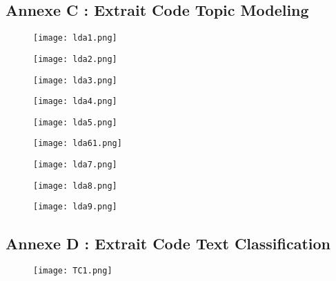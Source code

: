 \documentclass[a4paper,french,12pt]{article}
\begin{document}
\subsection{Annexe C : Extrait Code Topic Modeling}

\begin{figure}[!h]
    \centering
    \texttt{[image: lda1.png]}
\end{figure}

\begin{figure}[!h]
    \centering
    \texttt{[image: lda2.png]}
\end{figure}

\begin{figure}[!h]
    \centering
    \texttt{[image: lda3.png]}
\end{figure}

\begin{figure}[!h]
    \centering
    \texttt{[image: lda4.png]}
\end{figure}

\begin{figure}[!h]
    \centering
    \texttt{[image: lda5.png]}
\end{figure}

\begin{figure}[!h]
    \centering
    \texttt{[image: lda61.png]}
\end{figure}

\begin{figure}[!h]
    \centering
    \texttt{[image: lda7.png]}
\end{figure}

\begin{figure}[!h]
    \centering
    \texttt{[image: lda8.png]}
\end{figure}

\begin{figure}[!h]
    \centering
    \texttt{[image: lda9.png]}
\end{figure}

\clearpage

\subsection{Annexe D : Extrait Code Text Classification}

\vspace{20mm}

\begin{figure}[!h]
    \centering
    \texttt{[image: TC1.png]}
\end{figure}
\end{document}
